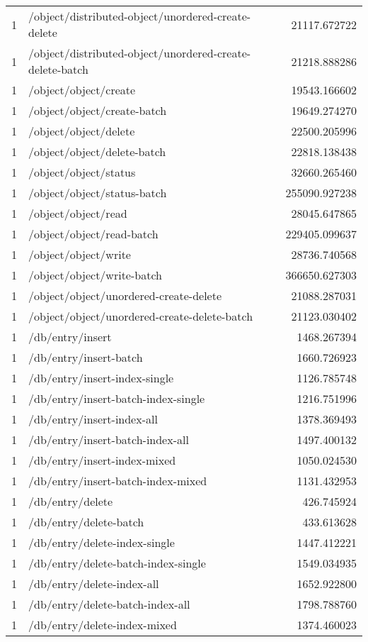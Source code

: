 \begin{longtable}{rlr}
1 & /object/distributed-object/unordered-create-delete & 21117.672722 \\
1 & /object/distributed-object/unordered-create-delete-batch & 21218.888286 \\
1 & /object/object/create & 19543.166602 \\
1 & /object/object/create-batch & 19649.274270 \\
1 & /object/object/delete & 22500.205996 \\
1 & /object/object/delete-batch & 22818.138438 \\
1 & /object/object/status & 32660.265460 \\
1 & /object/object/status-batch & 255090.927238 \\
1 & /object/object/read & 28045.647865 \\
1 & /object/object/read-batch & 229405.099637 \\
1 & /object/object/write & 28736.740568 \\
1 & /object/object/write-batch & 366650.627303 \\
1 & /object/object/unordered-create-delete & 21088.287031 \\
1 & /object/object/unordered-create-delete-batch & 21123.030402 \\
1 & /db/entry/insert & 1468.267394 \\
1 & /db/entry/insert-batch & 1660.726923 \\
1 & /db/entry/insert-index-single & 1126.785748 \\
1 & /db/entry/insert-batch-index-single & 1216.751996 \\
1 & /db/entry/insert-index-all & 1378.369493 \\
1 & /db/entry/insert-batch-index-all & 1497.400132 \\
1 & /db/entry/insert-index-mixed & 1050.024530 \\
1 & /db/entry/insert-batch-index-mixed & 1131.432953 \\
1 & /db/entry/delete & 426.745924 \\
1 & /db/entry/delete-batch & 433.613628 \\
1 & /db/entry/delete-index-single & 1447.412221 \\
1 & /db/entry/delete-batch-index-single & 1549.034935 \\
1 & /db/entry/delete-index-all & 1652.922800 \\
1 & /db/entry/delete-batch-index-all & 1798.788760 \\
1 & /db/entry/delete-index-mixed & 1374.460023 \\

\end{longtable}
